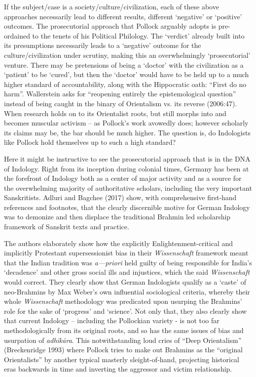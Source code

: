 If the subject/case is a society/culture/civilization, each of these above approaches necessarily lead to different results, different ‘negative’ or ‘positive’ outcomes. The prosecutorial approach that Pollock arguably adopts is pre-ordained to the tenets of his Political Philology. The ‘verdict’ already built into its presumptions necessarily leads to a ‘negative’ outcome for the culture/civilization under scrutiny, making this an overwhelmingly ‘prosecutorial’ venture. There may be pretensions of being a ‘doctor’ with the civilization as a ‘patient’ to be ‘cured’, but then the ‘doctor’ would have to be held up to a much higher standard of accountability, along with the Hippocratic oath: “First do no harm”. Wallerstein asks for “reopening entirely the epistemological question” instead of being caught in the binary of Orientalism vs. its reverse (2006:47). When research holds on to its Orientalist roots, but still morphs into and becomes muscular activism – as Pollock’s work avowedly does; however scholarly its claims may be, the bar should be much higher. The question is, do Indologists like Pollock hold themselves up to such a high standard?

Here it might be instructive to see the prosecutorial approach that is in the DNA of Indology. Right from its inception during colonial times, Germany has been at the forefront of Indology both as a center of major activity and as a source for the overwhelming majority of authoritative scholars, including the very important Sanskritists. Adluri and Bagchee (2017) show, with comprehensive first-hand references and footnotes, that the clearly discernible motive for German Indology was to demonize and then displace the traditional Brahmin led scholarship framework of Sanskrit texts and practice.

The authors elaborately show how the explicitly Enlightenment-critical and implicitly Protestant supersessionist bias in their \textit{Wissenschaft} framework meant that the Indian tradition was \textit{a---priori} held guilty of being responsible for India’s ‘decadence’ and other gross social ills and injustices, which the said \textit{Wissenschaft} would correct. They clearly show that German Indologists qualify as a ‘caste’ of neo-Brahmins by Max Weber’s own influential sociological criteria, whereby their whole \textit{Wissenschaft} methodology was predicated upon usurping the Brahmins’ role for the sake of ‘progress’ and ‘science’. Not only that, they also clearly show that current Indology – including the Pollockian variety - is not too far methodologically from its original roots, and so has the same issues of bias and usurpation of \textit{adhikāra}. This notwithstanding loud cries of “Deep Orientalism” (Breckenridge 1993) where Pollock tries to make out Brahmins as the “original Orientalists” by another typical masterly sleight-of-hand, projecting historical eras backwards in time and inverting the aggressor and victim relationship.


